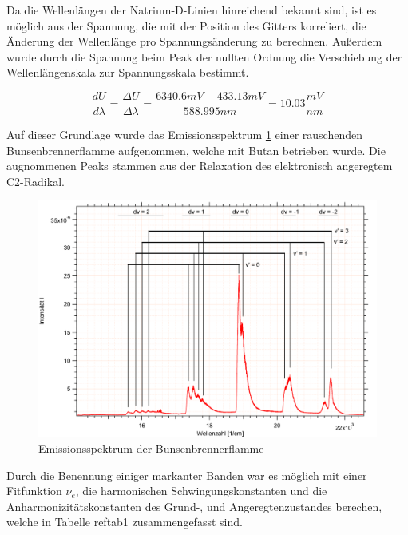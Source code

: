 


Da die Wellenlängen der Natrium-D-Linien hinreichend bekannt sind, ist es möglich aus der Spannung, die mit der Position des Gitters korreliert, die Änderung der Wellenlänge pro Spannungsänderung zu berechnen. Außerdem wurde durch die Spannung beim Peak der nullten Ordnung die Verschiebung der Wellenlängenskala zur Spannungsskala bestimmt.

\begin {equation}
\frac{dU}{d\lambda}=\frac{\Delta U}{\Delta\lambda}=\frac{6340.6 mV - 433.13 mV}{588.995 nm}=10.03 \frac{mV}{nm}
\end {equation}


Auf dieser Grundlage wurde das Emissionsspektrum \ref{Bunsen} einer rauschenden Bunsenbrennerflamme aufgenommen, welche mit Butan betrieben wurde. Die augnommenen Peaks stammen aus der Relaxation des elektronisch angeregtem C2-Radikal.



\begin{figure}[H]
	\centering	
	\begin{minipage}{1\textwidth}
	\includegraphics[width=\columnwidth]{Bilder/Graph3.png}
	\end{minipage}
	
	
	\caption{Emissionsspektrum der Bunsenbrennerflamme}
	

	\label{Bunsen}
\end{figure}

Durch die Benennung einiger markanter Banden war es möglich mit einer Fitfunktion $\nu_e$, die harmonischen Schwingungskonstanten und die Anharmonizitätskonstanten des Grund-, und Angeregtenzustandes berechen, welche in Tabelle  ref{tab1} zusammengefasst sind.


